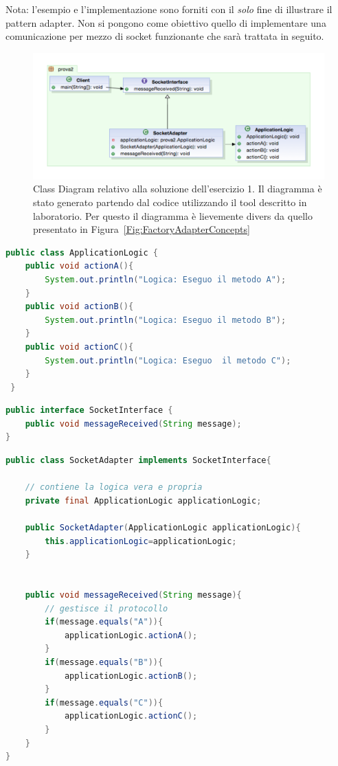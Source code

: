 \documentclass{article}
\begin{document}
Nota: l'esempio e l'implementazione sono forniti con il \emph{solo} fine di illustrare il pattern adapter. Non si pongono come obiettivo quello di implementare una comunicazione per mezzo di socket funzionante che sar\`a trattata in seguito.



\begin{figure}[h]
\includegraphics[width=1\textwidth]{Img/AdapterEsercizio1.pdf}
\caption{Class Diagram relativo alla soluzione dell'esercizio 1. Il diagramma \`e stato generato partendo dal codice utilizzando il tool descritto in laboratorio. Per questo il diagramma \`e lievemente divers da quello presentato in Figura~\ref{Fig:FactoryAdapterConcepts}}
\label{Fig:AdapterEsercizio1}
\end{figure}

\begin{lstlisting}[language=Java]
public class ApplicationLogic {
    public void actionA(){
    	System.out.println("Logica: Eseguo il metodo A");
    }
    public void actionB(){
    	System.out.println("Logica: Eseguo il metodo B");
    }
    public void actionC(){
    	System.out.println("Logica: Eseguo  il metodo C");
    }
 }
\end{lstlisting}

\begin{lstlisting}[language=Java]
public interface SocketInterface {
	public void messageReceived(String message);
}
\end{lstlisting}

\begin{lstlisting}[language=Java]
public class SocketAdapter implements SocketInterface{
	
	// contiene la logica vera e propria
	private final ApplicationLogic applicationLogic;
	
	public SocketAdapter(ApplicationLogic applicationLogic){
		this.applicationLogic=applicationLogic;
	}
	
	
	public void messageReceived(String message){
		// gestisce il protocollo
		if(message.equals("A")){
			applicationLogic.actionA();
		}
		if(message.equals("B")){
			applicationLogic.actionB();
		}
		if(message.equals("C")){
			applicationLogic.actionC();
		}
	}
}
\end{lstlisting}
\end{document}
